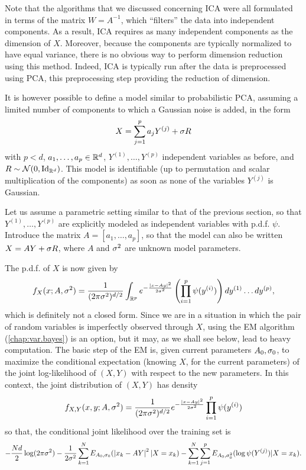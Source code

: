 Note that the algorithms that we discussed concerning ICA were all formulated in terms of the matrix $W = A^{-1}$, which ``filters'' the data into independent components. As a result, ICA requires as many independent components 
 as the dimension of  $X$. Moreover, because the components are typically normalized to have equal variance, there is no obvious way to perform dimension reduction using this method. Indeed, ICA is typically run after the data is preprocessed using PCA, this preprocessing step providing the reduction of dimension.

It is however possible to define a model similar to probabilistic PCA, assuming a limited number of components to which a Gaussian noise is added, in the form
$$
X  = \sum_{j=1}^p a_j Y^{(j)} + \sigma R 
$$
with $p< d$, $a_1, \ldots, a_p\in {\mathbb{R}}^d$,  $Y^{(1)},
\ldots, Y^{(p)}$ independent variables as before, and $R \sim \CN(0, \Id_{\mR^d})$.  This model is identifiable (up to permutation and scalar multiplication of the components) as soon as none of the variables $Y^{(j)}$  is Gaussian.

 Let us assume a parametric setting similar to that of the previous section, so that $Y^{(1)}, \ldots, Y^{(p)}$ are explicitly modeled as independent variables with p.d.f. $\psi$. Introduce the matrix $A = [a_1, \ldots, a_p]$, so that the model 
can also be written $X = AY +\sigma R$, where  $A$ and 
$\sigma^2$ are unknown model parameters.

The p.d.f. of $X$ is now given by
\[
f_X(x; A, \sigma^2) = \frac{1}{(2\pi\sigma^2)^{d/2}} \int_{{\mathbb{R}}^p} e^{-\frac{|x - Ay|^2}{2\sigma^2}} \left(\prod_{i=1}^p \psi(y^{(i)})\right)  dy^{(1)}\ldots dy^{(p)},
\]
which is definitely not a closed form. Since we are in  a situation in which
the pair of random variables is imperfectly observed through $X$, using the
EM algorithm (\cref{chap:var.bayes}) is an option, but it may, as we shall see below,  lead to  heavy computation. The
basic step of the EM is, given current parameters $A_0, \sigma_0$, to
maximize the conditional expectation (knowing $X$, for the current parameters) of
the joint log-likelihood of $(X,Y)$ with respect to the new
parameters. In this context,  the joint distribution of $(X,Y)$ has density
$$
f_{X,Y}(x,y;A, \sigma^2) = \frac{1}{(2\pi\sigma^2)^{d/2}}e^{-\frac{\left| x- Ay \right|^2}{2\sigma^2} } \prod_{i=1}^p \psi(y^{(i)})
$$
so that, the conditional joint likelihood over the training set is
\begin{multline*}
- \frac{Nd}{2}\log (2\pi\sigma^2)  - \frac{1}{2\sigma^2} \sum_{k=1}^N E_{A_0,
\sigma_0}( \left| x_k- AY \right|^2 | X=x_k) 
- \sum_{k=1}^N \sum_{j=1}^p  E_{A_0, \sigma_0^2}
(\log \psi(Y^{(j)}) | X=x_k).
\end{multline*}


